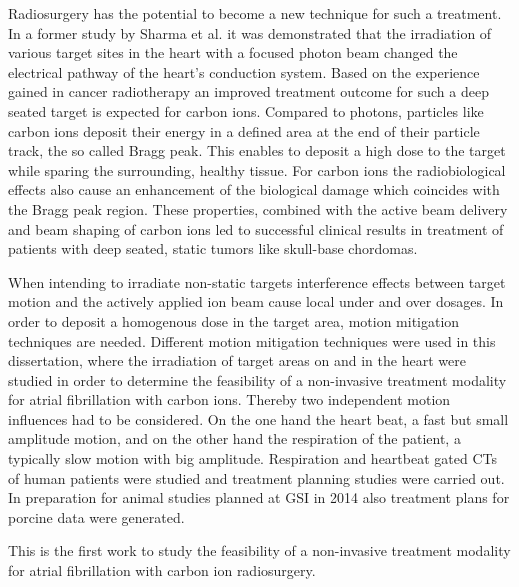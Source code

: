 \documentclass[type=dr, dr=rernat, accentcolor=tud7b,colorbacktitle, bigchapter, openright, twoside, 12pt ]{tudthesis}
\begin{document}
Radiosurgery has the potential to become a new technique for such a treatment. In a former study by Sharma et al. \cite{Sha10} it was demonstrated 
that the irradiation of various target sites in the heart with a focused photon beam changed the electrical pathway of the heart's conduction system. 
Based on the experience gained in cancer radiotherapy an improved treatment outcome for such a deep seated target is expected for carbon ions. 
Compared to photons, particles like carbon ions deposit their energy in a defined area at the end of their particle track, the so called Bragg 
peak. This enables to deposit a high dose to the target while sparing the surrounding, healthy tissue. For carbon ions the radiobiological 
effects also cause an enhancement of the biological damage which coincides with the Bragg peak region. These properties, combined with the active 
beam delivery and beam shaping of carbon ions led to successful clinical results in treatment of patients with deep seated, static tumors like 
skull-base chordomas.

\newpage

When intending to irradiate non-static targets interference effects between target motion and the actively applied ion 
beam cause local under and over dosages. In order to deposit a homogenous dose in the target area, motion mitigation techniques are needed.
Different motion mitigation techniques were used in this dissertation, where the irradiation of target areas on and in the heart were studied 
in order to determine the feasibility of a non-invasive treatment modality for atrial fibrillation with carbon ions. Thereby two independent 
motion influences had to be considered. On the one hand the heart beat, a fast but small amplitude motion, and on the other hand the 
respiration of the patient, a typically slow motion with big amplitude. Respiration and heartbeat gated CTs of human patients 
were studied and treatment planning studies were carried out. In preparation for animal studies planned at GSI in 2014 also treatment
plans for porcine data were generated. \newline

This is the first work to study the feasibility of a non-invasive treatment modality for atrial fibrillation with carbon ion 
radiosurgery.\newline
\end{document}

